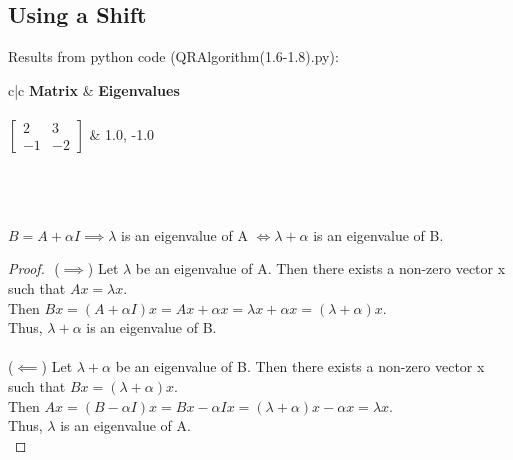 \documentclass[12pt]{article}
\begin{document}
\subsection{Using a Shift}
    Results from python code (QRAlgorithm(1.6-1.8).py): \\
    \begin{tabular}{c|c}
        \textbf{Matrix} & \textbf{Eigenvalues} \\
        \hline \\
        \(\begin{bmatrix} 2 & 3 \\ -1 & -2 \end{bmatrix}\) & 1.0, -1.0 \\
    \end{tabular} \\ \\ \\
$B = A + \alpha I \implies \lambda$ is an eigenvalue of A $\iff \lambda + \alpha$ is an eigenvalue of B. 
\begin{proof}
    $ $\newline
    ($\implies$) Let $\lambda$ be an eigenvalue of A. Then there exists a non-zero vector x such that $Ax = \lambda x$. \\
    Then $Bx = (A + \alpha I)x = Ax + \alpha x = \lambda x + \alpha x = (\lambda + \alpha)x$. \\ 
    Thus, $\lambda + \alpha$ is an eigenvalue of B. \\ \\
    ($\impliedby$) Let $\lambda + \alpha$ be an eigenvalue of B. Then there exists a non-zero vector x such that $Bx = (\lambda + \alpha)x$. \\
    Then $Ax = (B - \alpha I) x = Bx - \alpha I x = (\lambda + \alpha)x - \alpha x = \lambda x$. \\
    Thus, $\lambda$ is an eigenvalue of A. \\ 
\end{proof}
\end{document}
